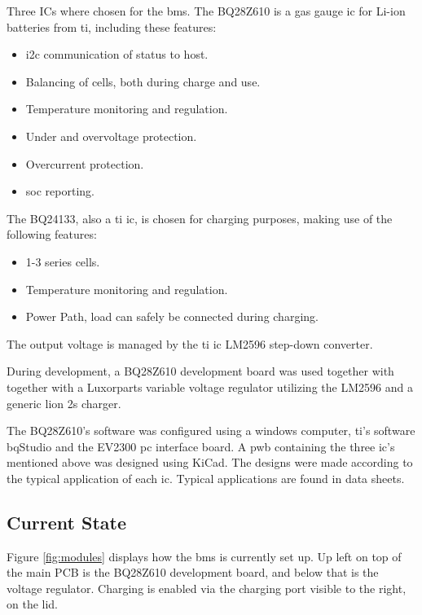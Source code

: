 Three ICs where chosen for the \gls{bms}. The BQ28Z610 is a gas gauge \gls{ic} for Li-ion batteries from \gls{ti}, including these features:

\begin{itemize}[noitemsep]
	\item \gls{i2c} communication of status to host.
	\item Balancing of cells, both during charge and use.
	\item Temperature monitoring and regulation.
	\item Under and overvoltage protection.
	\item Overcurrent protection.
	\item \gls{soc} reporting.
\end{itemize}

The BQ24133, also a \gls{ti} \gls{ic}, is chosen for charging purposes, making use of the following features:

\begin{itemize}[noitemsep]
	\item 1-3 series cells.
	\item Temperature monitoring and regulation.
	\item Power Path, load can safely be connected during charging.
\end{itemize}

The output voltage is managed by the \gls{ti} \gls{ic} LM2596 step-down converter.

During development, a BQ28Z610 development board was used together with together with a Luxorparts variable voltage regulator utilizing the LM2596 and a generic \gls{lion} \gls{2s} charger.

The BQ28Z610’s software was configured using a windows computer, \gls{ti}’s software bqStudio and the EV2300 \gls{pc} interface board.
A \gls{pwb} containing the three \gls{ic}’s mentioned above was designed using KiCad. The designs were made according to the typical application of each \gls{ic}. Typical applications are found in data sheets.  

\subsection{Current State}
Figure \autoref{fig:modules} displays how the \gls{bms} is currently set up. Up left on top of the main PCB is the BQ28Z610 development board, and below that is the voltage regulator. Charging is enabled via the charging port visible to the right, on the lid.

